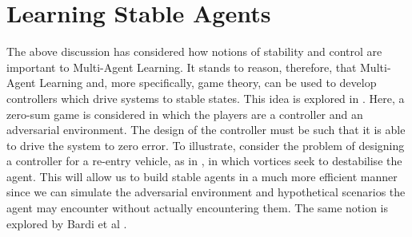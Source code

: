 \documentclass[preprint,11pt]{report}
\begin{document}
\section{Learning Stable Agents}

The above discussion has considered how notions of stability and control are important to
Multi-Agent Learning. It stands to reason, therefore, that Multi-Agent Learning and, more
specifically, game theory, can be used to develop controllers which drive systems to stable states.
This idea is explored in \cite{Marden2018AnnualControl}. Here, a zero-sum game is considered in
which the players are a controller and an adversarial environment. The design of the controller must
be such that it is able to drive the system to zero error. To illustrate, consider the problem of
designing a controller for a re-entry vehicle, as in \cite{Breitner1994ReentryGame}, in which
vortices seek to destabilise the agent. This will allow us to build stable agents in a much more
efficient manner since we can simulate the adversarial environment and hypothetical scenarios the
agent may encounter without actually encountering them. The same notion is explored by Bardi et al
\cite{Bardi1991DifferentialDisturbances}.
\end{document}
